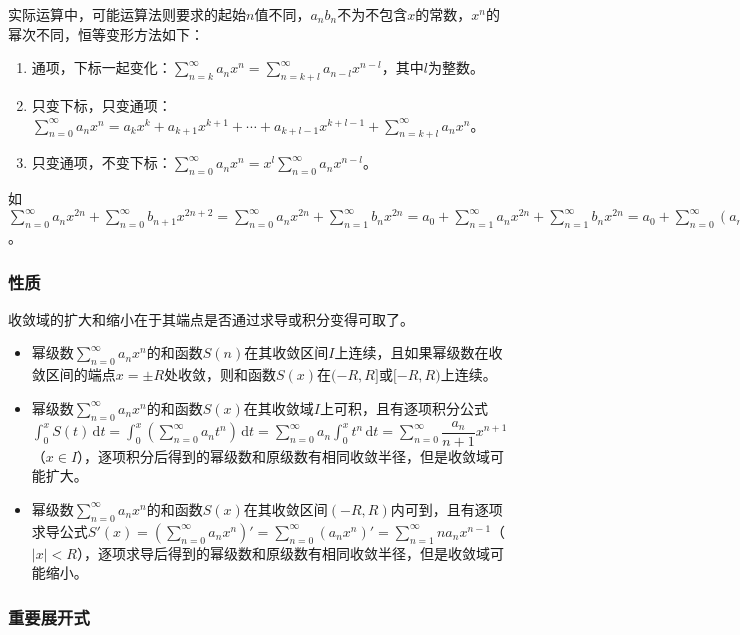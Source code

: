 \documentclass[UTF8, 12pt]{ctexart}
\begin{document}
实际运算中，可能运算法则要求的起始$n$值不同，$a_nb_n$不为不包含$x$的常数，$x^n$的幂次不同，恒等变形方法如下：

\begin{enumerate}
    \item 通项，下标一起变化：$\sum\limits_{n=k}^\infty a_nx^n=\sum\limits_{n=k+l}^\infty a_{n-l}x^{n-l}$，其中$l$为整数。
    \item 只变下标，只变通项：$\sum\limits_{n=0}^\infty a_nx^n=a_kx^k+a_{k+1}x^{k+1}+\cdots+a_{k+l-1}x^{k+l-1}+\sum\limits_{n=k+l}^\infty a_nx^n$。
    \item 只变通项，不变下标：$\sum\limits_{n=0}^\infty a_nx^n=x^l\sum\limits_{n=0}^\infty a_nx^{n-l}$。
\end{enumerate}

如$\sum\limits_{n=0}^\infty a_nx^{2n}+\sum\limits_{n=0}^\infty b_{n+1}x^{2n+2}=\sum\limits_{n=0}^\infty a_nx^{2n}+\sum\limits_{n=1}^\infty b_nx^{2n}=a_0+\sum\limits_{n=1}^\infty a_nx^{2n}+\sum\limits_{n=1}^\infty b_nx^{2n}=a_0+\sum\limits_{n=0}^\infty(a_n+b_n)x^{2n}$。

\subsubsection{性质}

收敛域的扩大和缩小在于其端点是否通过求导或积分变得可取了。

\begin{itemize}
    \item 幂级数$\sum\limits_{n=0}^\infty a_nx^n$的和函数$S(n)$在其收敛区间$I$上连续，且如果幂级数在收敛区间的端点$x=\pm R$处收敛，则和函数$S(x)$在$(-R,R]$或$[-R,R)$上连续。
    \item 幂级数$\sum\limits_{n=0}^\infty a_nx^n$的和函数$S(x)$在其收敛域$I$上可积，且有逐项积分公式$\int_0^xS(t)\,\textrm{d}t=\int_0^x(\sum\limits_{n=0}^\infty a_nt^n)\,\textrm{d}t=\sum\limits_{n=0}^\infty a_n\int_0^xt^n\,\textrm{d}t=\sum\limits_{n=0}^\infty\dfrac{a_n}{n+1}x^{n+1}$（$x\in I$），逐项积分后得到的幂级数和原级数有相同收敛半径，但是收敛域可能扩大。
    \item 幂级数$\sum\limits_{n=0}^\infty a_nx^n$的和函数$S(x)$在其收敛区间$(-R,R)$内可到，且有逐项求导公式$S'(x)=(\sum\limits_{n=0}^\infty a_nx^n)'=\sum\limits_{n=0}^\infty(a_nx^n)'=\sum\limits_{n=1}^\infty na_nx^{n-1}$（$\vert x\vert<R$），逐项求导后得到的幂级数和原级数有相同收敛半径，但是收敛域可能缩小。
\end{itemize}

\subsubsection{重要展开式}
\end{document}
